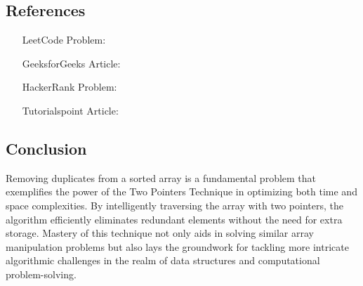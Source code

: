 \subsection*{References}
\begin{itemize}
    \item [LeetCode Problem:] 
    \item [GeeksforGeeks Article:] 
    \item [HackerRank Problem:] 
    \item [Tutorialspoint Article:] 
\end{itemize}

\subsection*{Conclusion}
Removing duplicates from a sorted array is a fundamental problem that exemplifies the power of the Two Pointers Technique in optimizing both time and space complexities. By intelligently traversing the array with two pointers, the algorithm efficiently eliminates redundant elements without the need for extra storage. Mastery of this technique not only aids in solving similar array manipulation problems but also lays the groundwork for tackling more intricate algorithmic challenges in the realm of data structures and computational problem-solving.
